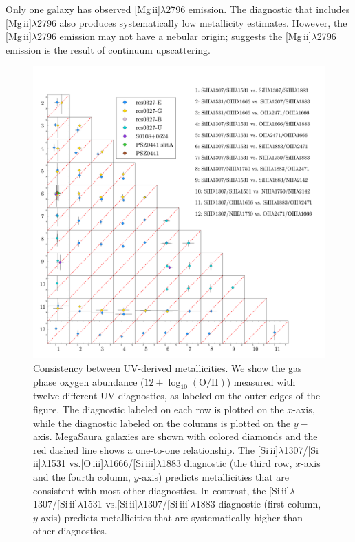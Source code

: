 \documentclass[preprint2]{aastex62}
\newcommand{\oiii}{[O\,{\sc iii}]\xspace}
\newcommand{\SiuII}{[Si\,{\sc ii}]\xspace}
\newcommand{\SiuIII}{[Si\,{\sc iii}]\xspace}
\newcommand{\mgii}{[Mg\,{\sc ii}]\xspace}
\newcommand\vs{\ensuremath{\mathrm{vs.}}\xspace}
\newcommand{\logten}{\ensuremath{\log_{10}}}
\newcommand{\logOH}{\ensuremath{\logten (\mathrm{O}/\mathrm{H})}\xspace}
\newcommand{\mage}{{\sc Meg}a{\sc S}a{\sc ura}\xspace}
\begin{document}
Only one galaxy has observed \mgii$\lambda$2796 emission. The diagnostic that includes \mgii$\lambda$2796 also produces systematically low metallicity estimates. However, the \mgii$\lambda$2796 emission may not have a nebular origin; \citet{Rigby+2018a} suggests the \mgii$\lambda$2796 emission is the result of continuum upscattering.

\begin{figure}
  \begin{center}
    \includegraphics[width=\linewidth]{figs/f6.png}
    \caption{Consistency between UV-derived metallicities. We show the gas phase oxygen abundance ($12+$\logOH) measured with twelve different UV-diagnostics, as labeled on the outer edges of the figure. The diagnostic labeled on each row is plotted on the $x$-axis, while the diagnostic labeled on the columns is plotted on the $y-$axis. \mage galaxies are shown with colored diamonds and the red dashed line shows a one-to-one relationship. The \SiuII$\lambda$1307/\SiuII$\lambda$1531 \vs \oiii$\lambda$1666/\SiuIII$\lambda$1883 diagnostic (the third row, $x$-axis and the fourth column, $y$-axis) predicts metallicities that are consistent with most other diagnostics. In contrast, the \SiuII$\lambda$1307/\SiuII$\lambda$1531 \vs \SiuII$\lambda$1307/\SiuIII$\lambda$1883 diagnostic (first column, $y$-axis) predicts metallicities that are systematically higher than other diagnostics.}
    \label{fig:UVUV}
  \end{center}
\end{figure}
\end{document}
